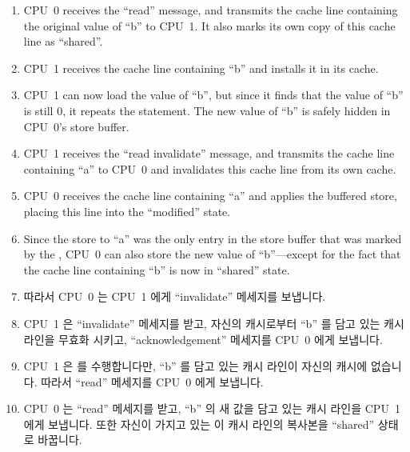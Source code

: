 \begin{enumerate}
\item	CPU~0 receives the ``read'' message, and transmits the
	cache line containing the original value of ``b''
	to CPU~1.
	It also marks its own copy of this cache line as ``shared''.
\item	CPU~1 receives the cache line containing ``b'' and installs
	it in its cache.
\item	CPU~1 can now load the value of ``b'',
	but since it finds that the value of ``b'' is still 0, it repeats
	the  statement.
	The new value of ``b'' is safely hidden in CPU~0's store buffer.
\item	CPU~1 receives the ``read invalidate'' message, and
	transmits the cache line containing ``a'' to CPU~0 and
	invalidates this cache line from its own cache.
\item	CPU~0 receives the cache line containing ``a'' and applies
	the buffered store, placing this line into the ``modified''
	state.
\item	Since the store to ``a'' was the only
	entry in the store buffer that was marked by the ,
	CPU~0 can also store the new value of ``b''---except for the
	fact that the cache line containing ``b'' is now in ``shared''
	state.
\fi
\item	따라서 CPU~0 는 CPU~1 에게 ``invalidate'' 메세지를 보냅니다.
\item	CPU~1 은 ``invalidate'' 메세지를 받고, 자신의 캐시로부터 ``b'' 를 담고
	있는 캐시 라인을 무효화 시키고, ``acknowledgement'' 메세지를 CPU~0 에게
	보냅니다.
\item	CPU~1 은  를 수행합니다만, ``b'' 를 담고
	있는 캐시 라인이 자신의 캐시에 없습니다.
	따라서 ``read'' 메세지를 CPU~0 에게 보냅니다.
\item	CPU~0 는 ``read'' 메세지를 받고, ``b'' 의 새 값을 담고 있는 캐시 라인을
	CPU~1 에게 보냅니다.
	또한 자신이 가지고 있는 이 캐시 라인의 복사본을 ``shared'' 상태로
	바꿉니다.
\iffalse


\end{enumerate}
